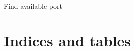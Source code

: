 \documentclass[letterpaper,10pt,english]{sphinxmanual}
\begin{document}
\begin{fulllineitems}
\label{\detokenize{utils:utils.find_free_port}}
\pysigstartsignatures
\pysiglinewithargsret
{}
{}
{}
\pysigstopsignatures
\sphinxAtStartPar
Find available port

\end{fulllineitems}



\chapter{Indices and tables}
\label{\detokenize{index:indices-and-tables}}

\renewcommand{\indexname}{Python Module Index}
\begin{sphinxtheindex}
\let\bigletter\sphinxstyleindexlettergroup
\bigletter{c}
\item\relax{}
\indexspace
\bigletter{m}
\item\relax{}
\indexspace
\bigletter{n}
\item\relax{}
\indexspace
\bigletter{u}
\item\relax{}
\end{sphinxtheindex}

\renewcommand{\indexname}{Index}
\printindex
\end{document}
